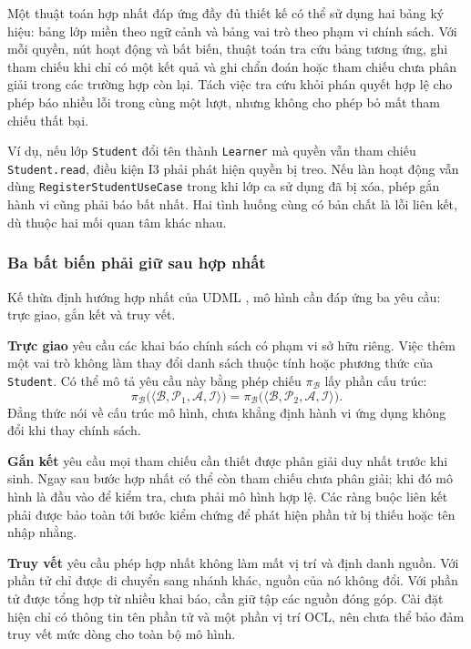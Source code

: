 Một thuật toán hợp nhất đáp ứng đầy đủ thiết kế có thể sử dụng hai bảng ký hiệu: bảng lớp miền theo ngữ cảnh và bảng vai trò theo phạm vi chính sách. Với mỗi quyền, nút hoạt động và bất biến, thuật toán tra cứu bảng tương ứng, ghi tham chiếu khi chỉ có một kết quả và ghi chẩn đoán hoặc tham chiếu chưa phân giải trong các trường hợp còn lại. Tách việc tra cứu khỏi phán quyết hợp lệ cho phép báo nhiều lỗi trong cùng một lượt, nhưng không cho phép bỏ mất tham chiếu thất bại.

Ví dụ, nếu lớp \texttt{Student} đổi tên thành \texttt{Learner} mà quyền vẫn tham chiếu \texttt{Student.read}, điều kiện I3 phải phát hiện quyền bị treo. Nếu làn hoạt động vẫn dùng \texttt{RegisterStudentUseCase} trong khi lớp ca sử dụng đã bị xóa, phép gắn hành vi cũng phải báo bất nhất. Hai tình huống cùng có bản chất là lỗi liên kết, dù thuộc hai mối quan tâm khác nhau.

\subsubsection{Ba bất biến phải giữ sau hợp nhất}

Kế thừa định hướng hợp nhất của UDML \citep{le2025udml}, mô hình cần đáp ứng ba yêu cầu: trực giao, gắn kết và truy vết.

\textbf{Trực giao} yêu cầu các khai báo chính sách có phạm vi sở hữu riêng. Việc thêm một vai trò không làm thay đổi danh sách thuộc tính hoặc phương thức của \texttt{Student}. Có thể mô tả yêu cầu này bằng phép chiếu $\pi_{\mathcal{B}}$ lấy phần cấu trúc:
\[
\pi_{\mathcal{B}}\bigl(\langle\mathcal{B},\mathcal{P}_1,\mathcal{A},\mathcal{I}\rangle\bigr)
=
\pi_{\mathcal{B}}\bigl(\langle\mathcal{B},\mathcal{P}_2,\mathcal{A},\mathcal{I}\rangle\bigr).
\]
Đẳng thức nói về cấu trúc mô hình, chưa khẳng định hành vi ứng dụng không đổi khi thay chính sách.

\textbf{Gắn kết} yêu cầu mọi tham chiếu cần thiết được phân giải duy nhất trước khi sinh. Ngay sau bước hợp nhất có thể còn tham chiếu chưa phân giải; khi đó mô hình là đầu vào để kiểm tra, chưa phải mô hình hợp lệ. Các ràng buộc liên kết phải được bảo toàn tới bước kiểm chứng để phát hiện phần tử bị thiếu hoặc tên nhập nhằng.

\textbf{Truy vết} yêu cầu phép hợp nhất không làm mất vị trí và định danh nguồn. Với phần tử chỉ được di chuyển sang nhánh khác, nguồn của nó không đổi. Với phần tử được tổng hợp từ nhiều khai báo, cần giữ tập các nguồn đóng góp. Cài đặt hiện chỉ có thông tin tên phần tử và một phần vị trí OCL, nên chưa thể bảo đảm truy vết mức dòng cho toàn bộ mô hình.

